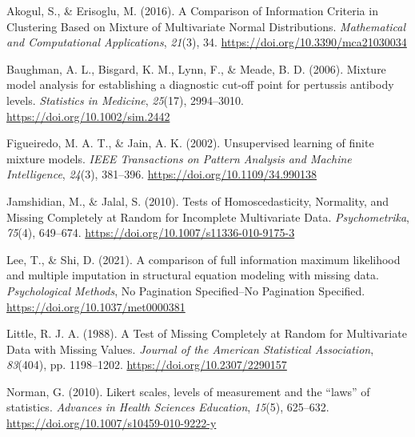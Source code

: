 \documentclass[
  ,man]{apa6}
\newlength{\cslhangindent}
\newlength{\cslentryspacingunit} %
\newenvironment{CSLReferences}[2] %
 {%
  \setlength{\parindent}{0pt}
  \ifodd #1
  \let\oldpar\par
  \def\par{\hangindent=\cslhangindent\oldpar}
  \fi
  \setlength{\parskip}{#2\cslentryspacingunit}
 }%
 {}
\begin{document}
\hypertarget{refs}{}
\begin{CSLReferences}{1}{0}
\leavevmode{}%
Akogul, S., \& Erisoglu, M. (2016). A {Comparison} of {Information Criteria} in {Clustering Based} on {Mixture} of {Multivariate Normal Distributions}. \emph{Mathematical and Computational Applications}, \emph{21}(3), 34. \url{https://doi.org/10.3390/mca21030034}

\leavevmode{}%
Baughman, A. L., Bisgard, K. M., Lynn, F., \& Meade, B. D. (2006). Mixture model analysis for establishing a diagnostic cut-off point for pertussis antibody levels. \emph{Statistics in Medicine}, \emph{25}(17), 2994--3010. \url{https://doi.org/10.1002/sim.2442}

\leavevmode{}%
Figueiredo, M. A. T., \& Jain, A. K. (2002). Unsupervised learning of finite mixture models. \emph{IEEE Transactions on Pattern Analysis and Machine Intelligence}, \emph{24}(3), 381--396. \url{https://doi.org/10.1109/34.990138}

\leavevmode{}%
Jamshidian, M., \& Jalal, S. (2010). Tests of {Homoscedasticity}, {Normality}, and {Missing Completely} at {Random} for {Incomplete Multivariate Data}. \emph{Psychometrika}, \emph{75}(4), 649--674. \url{https://doi.org/10.1007/s11336-010-9175-3}

\leavevmode{}%
Lee, T., \& Shi, D. (2021). A comparison of full information maximum likelihood and multiple imputation in structural equation modeling with missing data. \emph{Psychological Methods}, No Pagination Specified--No Pagination Specified. \url{https://doi.org/10.1037/met0000381}

\leavevmode{}%
Little, R. J. A. (1988). A {Test} of {Missing Completely} at {Random} for {Multivariate Data} with {Missing Values}. \emph{Journal of the American Statistical Association}, \emph{83}(404), pp. 1198--1202. \url{https://doi.org/10.2307/2290157}

\leavevmode{}%
Norman, G. (2010). Likert scales, levels of measurement and the {``laws''} of statistics. \emph{Advances in Health Sciences Education}, \emph{15}(5), 625--632. \url{https://doi.org/10.1007/s10459-010-9222-y}


\end{CSLReferences}
\end{document}
